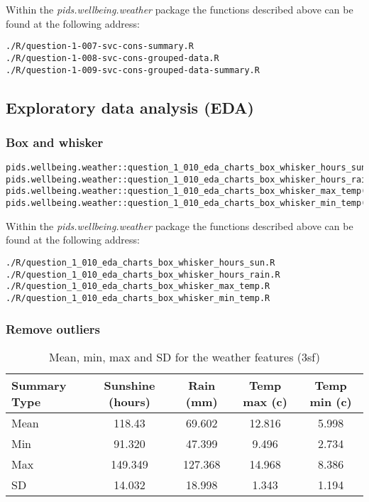 \documentclass[12pt, oneside, openany]{book}
\begin{document}
Within the \emph{pids.wellbeing.weather} package the functions described above can be found at the following address:

\begin{verbatim}
./R/question-1-007-svc-cons-summary.R
./R/question-1-008-svc-cons-grouped-data.R
./R/question-1-009-svc-cons-grouped-data-summary.R
\end{verbatim}

\subsection*{Exploratory data analysis (EDA)}

\subsubsection*{Box and whisker}

\begin{verbatim}
pids.wellbeing.weather::question_1_010_eda_charts_box_whisker_hours_sun()
pids.wellbeing.weather::question_1_010_eda_charts_box_whisker_hours_rain()
pids.wellbeing.weather::question_1_010_eda_charts_box_whisker_max_temp()
pids.wellbeing.weather::question_1_010_eda_charts_box_whisker_min_temp()
\end{verbatim}

Within the \emph{pids.wellbeing.weather} package the functions described above can be found at the following address:

\begin{verbatim}
./R/question_1_010_eda_charts_box_whisker_hours_sun.R
./R/question_1_010_eda_charts_box_whisker_hours_rain.R
./R/question_1_010_eda_charts_box_whisker_max_temp.R
./R/question_1_010_eda_charts_box_whisker_min_temp.R
\end{verbatim}

\subsubsection*{Remove outliers}

\begin{table}[h!]
	\centering
	\begin{tabular}{ |l|c|c|c|c| }
		\hline
		Summary Type & Sunshine (hours) & Rain (mm) & Temp max (c) & Temp min (c)\\
		\hline
		\hline
		Mean & 118.43  & 69.602  & 12.816 & 5.998 \\
		Min & 91.320  & 47.399  & 9.496   & 2.734 \\
		Max & 149.349 & 127.368  & 14.968  & 8.386 \\
		SD & 14.032  & 18.998   & 1.343  & 1.194 \\
		\hline
	\end{tabular}
	\caption{Mean, min, max and SD for the weather features (3sf)}
	\label{table:question_1_008_grouped_data_summary_non_scaled}
\end{table}
\end{document}
